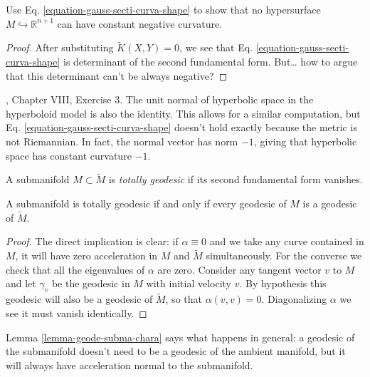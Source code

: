 \begin{exercise}
\label{exercise-Gauss-sectional}
Use Eq.
\ref{equation-gauss-secti-curva-shape}
to show that no
hypersurface $M \hookrightarrow
\mathbb{R}^{n+1}$ can have constant negative
curvature.
\end{exercise}

\begin{proof}
After substituting $\tilde{K}(X,Y)=0$, we see
that Eq.
\ref{equation-gauss-secti-curva-shape} is
determinant of the second fundamental form.
 But… how to argue that this determinant
 can't be always negative?
\end{proof}

\begin{example}
\label{example-hyperbolic-space}
\cite{doc}, Chapter VIII, Exercise 3. The
unit normal of hyperbolic space in the
hyperboloid model is also the identity. This
allows for a similar computation,
but Eq.
\ref{equation-gauss-secti-curva-shape}
doesn't hold
exactly because the
metric is not Riemannian. In fact, the normal
vector has norm $-1$, giving that
hyperbolic space has constant curvature $-1$.
\end{example}

\begin{definition}
\label{definition-total-geode-subma}
A submanifold $M\subset\tilde{M}$ is {\it
totally geodesic} if its second
fundamental form vanishes.
\end{definition}

\begin{lemma}
\label{lemma-totally-geodesic-submanifold}
A submanifold is totally geodesic if and only
if every geodesic of $M$ is a
geodesic of $\tilde{M}$.
\end{lemma}

\begin{proof}
The direct implication is clear: if $\alpha
\equiv 0$ and we take any curve
contained in $M$, it will have zero
acceleration in $M$ and $\tilde{M}$
simultaneously. For the converse we check
that all the eigenvalues
of $\alpha$ are zero. Consider any tangent
vector $v$ to $M$ and let $\gamma_v$
be the geodesic in $M$ with initial velocity
$v$. By hypothesis this geodesic
will also be a geodesic of $\tilde{M}$, so
that $\alpha(v,v)=0$. Diagonalizing
$\alpha$ we see it must vanish identically.
\end{proof}

Lemma \ref{lemma-geode-subma-chara}
says what happens in
general: a geodesic of the submanifold
doesn't need to be a geodesic of the
ambient manifold, but it will always have
acceleration normal to the
submanifold.

